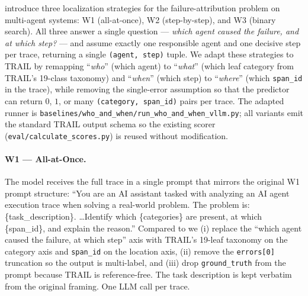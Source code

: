 \citet{yin2025whoandwhen} introduce three localization strategies
for the failure-attribution problem on multi-agent systems:
\textsc{W1} (all-at-once), \textsc{W2} (step-by-step), and
\textsc{W3} (binary search). All three answer a single
question --- \emph{which agent caused the failure, and at which
step?} --- and assume exactly one responsible agent and one
decisive step per trace, returning a single \texttt{(agent, step)}
tuple. We adapt these strategies to TRAIL by remapping
``\emph{who}'' (which agent) to ``\emph{what}'' (which leaf
category from TRAIL's 19-class taxonomy) and ``\emph{when}'' (which
step) to ``\emph{where}'' (which \texttt{span\_id} in the trace),
while removing the single-error assumption so that the predictor
can return $0$, $1$, or many \texttt{(category, span\_id)} pairs
per trace. The adapted runner is
\texttt{baselines/who\_and\_when/run\_who\_and\_when\_vllm.py};
all variants emit the standard TRAIL output schema so the
existing scorer (\texttt{eval/calculate\_scores.py}) is reused
without modification.

\paragraph{W1 --- All-at-Once.}
The model receives the full trace in a single prompt that mirrors the
original \textsc{W1} prompt structure: ``You are an AI assistant tasked
with analyzing an AI agent execution trace when solving a real-world
problem. The problem is: \{task\_description\}. \ldots Identify which
\{categories\} are present, at which \{span\_id\}, and explain the
reason.'' Compared to \citet{yin2025whoandwhen} we (i) replace the
``which agent caused the failure, at which step'' axis with TRAIL's
19-leaf taxonomy on the category axis and \texttt{span\_id} on the
location axis, (ii) remove the \texttt{errors[0]} truncation so the
output is multi-label, and (iii) drop \texttt{ground\_truth} from the
prompt because TRAIL is reference-free. The task description is kept
verbatim from the original framing. One LLM call per trace.

